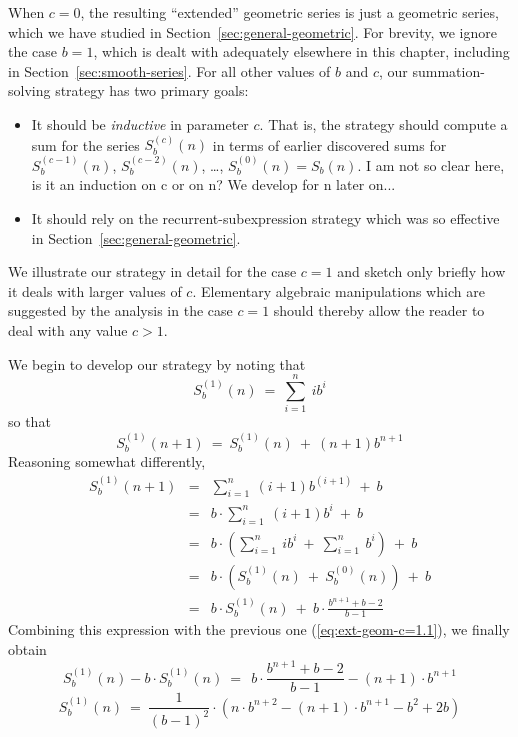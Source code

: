 When $c=0$, the resulting ``extended'' geometric series is just a
geometric series, which we have studied in
Section~\ref{sec:general-geometric}.  For brevity, we ignore the case
$b = 1$, which is dealt with adequately elsewhere in this chapter,
including in Section~\ref{sec:smooth-series}.  For all other values of
$b$ and $c$, our summation-solving strategy has two primary goals:
\begin{itemize}
\item
It should be {\em inductive} in parameter $c$.  That is, the strategy
should compute a sum for the series $S_b^{(c)}(n)$ in terms of earlier
discovered sums for $S_b^{(c-1)}(n)$, $S_b^{(c-2)}(n)$, \ldots,
$S_b^{(0)}(n) = S_b(n)$.
{\Denis I am not so clear here, is it an induction on c or on n? We develop for n later on...}

\item
It should rely on the recurrent-subexpression strategy which was so
effective in Section~\ref{sec:general-geometric}.
\end{itemize}
We illustrate our strategy in detail for the case $c=1$ and sketch
only briefly how it deals with larger values of $c$.  Elementary
algebraic manipulations which are suggested by the analysis in the
case $c=1$ should thereby allow the reader to deal with any value $c >
1$.

We begin to develop our strategy by noting that
\[ S_b^{(1)}(n) \ = \ \sum_{i=1}^n \ i b^i  \]
so that
\begin{equation}
\label{eq:ext-geom-c=1.1}
S_b^{(1)}(n+1) \ = \ S_b^{(1)}(n) \ + \ (n+1) b^{n+1}
\end{equation}
Reasoning somewhat differently,
\begin{eqnarray*}
S_b^{(1)}(n+1)
     & = &
\sum_{i=1}^n \ (i+1) b^{(i+1)} \ + \ b \\
     & = &
b \cdot \sum_{i=1}^n \ (i+1) b^i \ + \ b \\
     & = &
b \cdot \left(
\sum_{i=1}^n \ i b^i 
 \ + \
\sum_{i=1}^n \  b^i 
\right) \ + \ b \\
     & = &
b \cdot \left( S_b^{(1)}(n) \ + \ S_b^{(0)}(n) \right) \ + \ b \\
    & = &
b \cdot S_b^{(1)}(n) \ + \ b \cdot \frac{b^{n+1} + b - 2}{b-1}
\end{eqnarray*}
Combining this expression with the previous one (\ref{eq:ext-geom-c=1.1}), we
finally obtain
\[ S_b^{(1)}(n) - b \cdot S_b^{(1)}(n) \ = \
\ b \cdot \frac{b^{n+1} + b - 2}{b-1}
- (n+1) \cdot b^{n+1}
\]
\[ S_b^{(1)}(n) \ = \
\frac{1}{(b-1)^2} \cdot \left(
n \cdot b^{n+2} - (n+1) \cdot b^{n+1} - b^2 + 2b
\right)
\]



